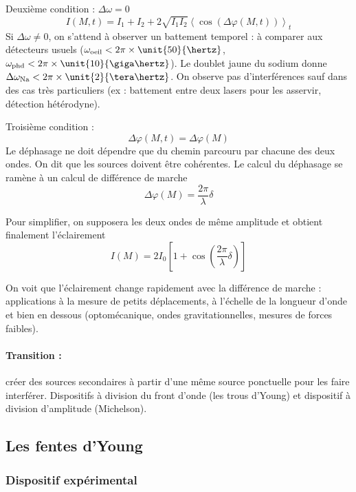 Deuxième condition : $\Delta\omega = 0$
\begin{equation}
I(M,t)= I_1 + I_2 + 2\sqrt{I_1I_2}\left< \cos(\Delta\varphi(M,t)) \right>_t
\end{equation}
Si $\Delta\omega \neq 0$, on s'attend à observer un battement temporel : à comparer aux détecteurs usuels ($\omega_\mathrm{oeil} < 2\pi\times\unit{50}{\hertz}$, $\omega_\mathrm{phd} < 2\pi\times\unit{10}{\giga\hertz}$).
Le doublet jaune du sodium donne $\Delta\omega_\mathrm{Na} < 2\pi\times\unit{2}{\tera\hertz}$.
On observe pas d'interférences sauf dans des cas très particuliers (ex : battement entre deux lasers pour les asservir, détection hétérodyne).

Troisième condition :
\begin{equation}
\Delta\varphi(M,t) = \Delta\varphi(M)
\end{equation}
Le déphasage ne doit dépendre que du chemin parcouru par chacune des deux ondes.
On dit que les sources doivent être cohérentes.
Le calcul du déphasage se ramène à un calcul de différence de marche
\begin{equation}
\Delta\varphi(M) = \frac{2\pi}{\lambda} \delta
\end{equation}

Pour simplifier, on supposera les deux ondes de même amplitude et obtient finalement l'éclairement
\begin{equation}
I(M) = 2I_0\left[1+\cos\left(\frac{2\pi}{\lambda}\delta\right)\right]
\end{equation}

On voit que l'éclairement change rapidement avec la différence de marche : applications à la mesure de petits déplacements, à l'échelle de la longueur d'onde et bien en dessous (optomécanique, ondes gravitationnelles, mesures de forces faibles).

\paragraph{Transition :} créer des sources secondaires à partir d'une même source ponctuelle pour les faire interférer. Dispositifs à division du front d'onde (les trous d'Young) et dispositif à division d'amplitude (Michelson).

\subsection{Les fentes d'Young}

\subsubsection{Dispositif expérimental}

